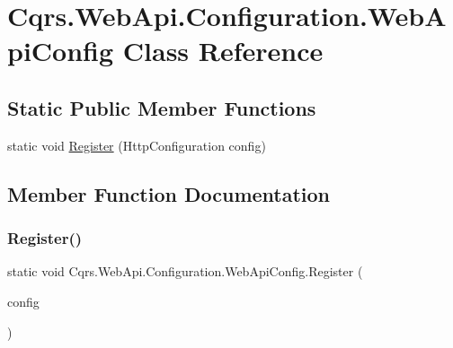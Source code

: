 \hypertarget{classCqrs_1_1WebApi_1_1Configuration_1_1WebApiConfig}{}\section{Cqrs.\+Web\+Api.\+Configuration.\+Web\+Api\+Config Class Reference}
\label{classCqrs_1_1WebApi_1_1Configuration_1_1WebApiConfig}
\subsection*{Static Public Member Functions}
\begin{DoxyCompactItemize}
\item 
static void \hyperlink{classCqrs_1_1WebApi_1_1Configuration_1_1WebApiConfig_a65d94167bd8c0e38ae6492adf3e56f5a}{Register} (Http\+Configuration config)
\end{DoxyCompactItemize}


\subsection{Member Function Documentation}
\mbox{\label{classCqrs_1_1WebApi_1_1Configuration_1_1WebApiConfig_a65d94167bd8c0e38ae6492adf3e56f5a}} 
\subsubsection{\texorpdfstring{Register()}{Register()}}
{\footnotesize\ttfamily static void Cqrs.\+Web\+Api.\+Configuration.\+Web\+Api\+Config.\+Register (\begin{DoxyParamCaption}\item[{Http\+Configuration}]{config }\end{DoxyParamCaption})\hspace{0.3cm}{\ttfamily [static]}}

